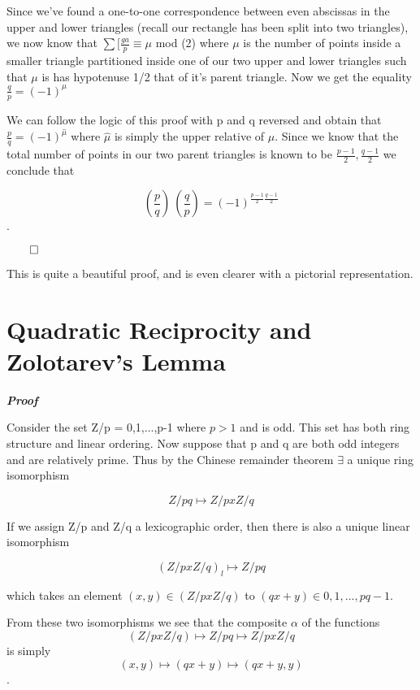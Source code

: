 \documentclass{article}
\begin{document}
\begin{spacing}{1.1}
\vspace{3mm}

Since we've found a one-to-one correspondence between even abscissas in the upper and lower triangles (recall our rectangle has been split into two triangles), we now know that $\sum [\frac{ga}{p} \equiv \mu$ mod (2) where $\mu$ is the number of points inside a smaller triangle partitioned inside one of our two upper and lower triangles such that $\mu$ is has hypotenuse 1/2 that of it's parent triangle.  Now we get the equality $\frac{q}{p} = (-1)^{\mu}$

We can follow the logic of this proof with p and q reversed and obtain that $\frac{p}{q} = (-1)^{\hat{\mu}}$ where $\hat{\mu}$ is simply the upper relative of $\mu$.  Since we know that the total number of points in our two parent triangles is known to be $\frac{p-1}{2}, \frac{q-1}{2}$ we conclude that

$$
(\frac{p}{q}) \ (\frac{q}{p}) = (-1)^{\frac{p-1}{2}\frac{q-1}{2}}
$$.  

$\qed$

\vspace{3mm}

This is quite a beautiful proof, and is even clearer with a pictorial representation.  

\vspace{5mm}
\newpage

\section{Quadratic Reciprocity and Zolotarev's Lemma}

\textit{\textbf{Proof}}

Consider the set Z/p = {0,1,...,p-1} where $p > 1$ and is odd.  This set has both ring structure and linear ordering.  Now suppose that p and q are both odd integers and are relatively prime.  Thus by the Chinese remainder theorem $\exists$ a unique ring isomorphism 

$$ Z/pq \mapsto Z/p x Z/q $$

If we assign Z/p and Z/q a lexicographic order, then there is also a unique linear isomorphism

$$(Z/p x Z/q)_l \mapsto Z/pq$$

which takes an element $(x,y) \in (Z/p x Z/q)$ to $(qx + y)\in{0,1,...,pq - 1}$.  

From these two isomorphisms we see that the composite $\alpha$ of the functions
$$ (Z/p x Z/q) \mapsto Z/pq \mapsto Z/p x Z/q $$
is simply 
$$ (x,y) \mapsto (qx + y) \mapsto (qx+y,y) $$.  


\end{spacing}
\end{document}
